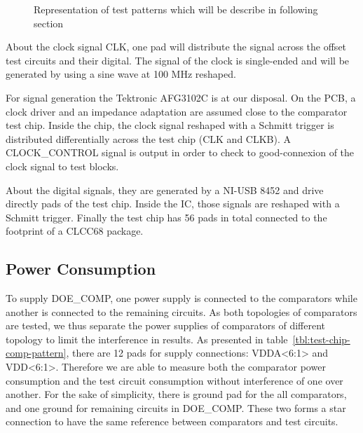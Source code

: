 \begin{figure}[htp]
\begin{subfigure}[b]{0.75\textwidth}
    \end{subfigure}
    \caption{Representation of test patterns which will be describe in following section}
    \label{fig:test-chip-comp-patterns}
\end{figure}

About the clock signal CLK, one pad will distribute the signal across the offset test circuits and their digital. The signal of the clock is single-ended and will be generated by using a sine wave at 100 MHz reshaped.

For signal generation the Tektronic AFG3102C is at our disposal. On the PCB, a clock driver and an impedance adaptation are assumed close to the comparator test chip. Inside the chip, the clock signal reshaped with a Schmitt trigger is distributed differentially across the test chip (CLK and CLKB). A CLOCK\_CONTROL signal is output in order to check to good-connexion of the clock signal to test blocks.

About the digital signals, they are generated by a NI-USB 8452 and drive directly pads of the test chip. Inside the IC, those signals are reshaped with a Schmitt trigger. Finally the test chip has 56 pads in total connected to the footprint of a CLCC68 package.

\subsection{Power Consumption}
To supply DOE\_COMP, one power supply is connected to the comparators while another is connected to the remaining circuits.
As both topologies of comparators are tested, we thus separate the power supplies of comparators of different topology to limit the interference in results. As presented in table~\ref{tbl:test-chip-comp-pattern}, there are 12 pads for supply connections: VDDA<6:1> and VDD<6:1>. Therefore we are able to measure both the comparator power consumption and the test circuit consumption without interference of one over another. For the sake of simplicity, there is ground pad for the all comparators, and one ground for remaining circuits in DOE\_COMP. These two forms a star connection to have the same reference between comparators and test circuits.

